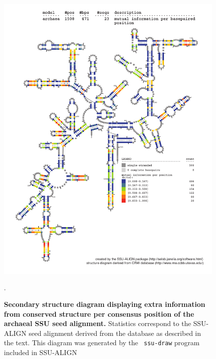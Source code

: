 \begin{figure}
\begin{center}
\includegraphics[width=5.64in]{Figures/archaea-0p1-mutinfo}
\end{center}
\caption[Secondary structure diagram displaying extra information 
  from conserved structure per consensus position of the archaeal SSU seed
  alignment]{\textbf{Secondary structure diagram displaying extra
  information from conserved structure per consensus position of the archaeal SSU seed
  alignment.} Statistics correspond to the SSU-ALIGN seed
  alignment derived from the  database \cite{CannoneGutell02}
  as described in the text. This diagram was generated by the {\tt
  ssu-draw} program included in SSU-ALIGN}.
\label{fig:arcsinfo}
\end{figure}

\newpage 

